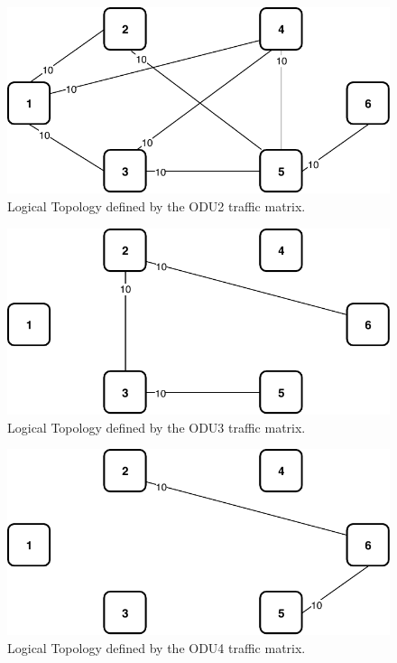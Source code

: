 \begin{figure}[h!]
\centering
\includegraphics[width=12cm]{sdf/ilp/opaque_protection/figures/logical_topology_ODU2_medium}
\caption{Logical Topology defined by the ODU2 traffic matrix.}
\label{logical_ODU2_protectionmedium}
\end{figure}

\begin{figure}[h!]
\centering
\includegraphics[width=12cm]{sdf/ilp/opaque_protection/figures/logical_topology_ODU3_medium}
\caption{Logical Topology defined by the ODU3 traffic matrix.}
\label{logical_ODU3_protectionmedium}
\end{figure}

\begin{figure}[h!]
\centering
\includegraphics[width=12cm]{sdf/ilp/opaque_protection/figures/logical_topology_ODU4_medium}
\caption{Logical Topology defined by the ODU4 traffic matrix.}
\label{logical_ODU4_protectionmedium}
\end{figure}

